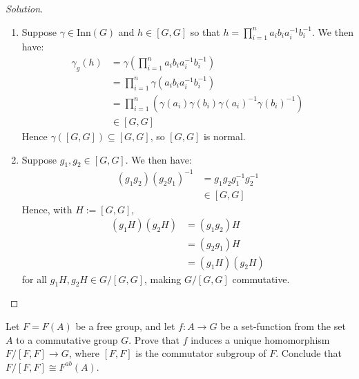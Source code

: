 \documentclass[12pt]{article}
\newenvironment{problem}[2][Problem]{\begin{trivlist}
\item[\hskip \labelsep {\bfseries #1}\hskip \labelsep {\bfseries #2.}]}{\end{trivlist}}
\newenvironment{solution}
  {\renewcommand\qedsymbol{$\blacksquare$}\begin{proof}[Solution]}
{\end{proof}}
\theoremstyle{remark}
\begin{document}
\begin{solution}~
  \begin{enumerate}
    \item Suppose $\gamma\in \text{Inn}(G)$ and $h\in [G,G]$ so that 
      $h = \prod_{i=1}^{n} a_ib_ia_i^{-1}b_i^{-1}$.
      We then have:
      \begin{align*}
        \gamma_g(h) &= \gamma\left( \prod_{i=1}^{n}a_ib_ia_i^{-1}b_i^{-1} \right) \\
        &= \prod_{i=1}^{n}\gamma(a_ib_ia_i^{-1}b_i^{-1}) \\
        &= \prod_{i=1}^{n}\left( \gamma(a_i)\gamma(b_i)\gamma(a_i)^{-1}\gamma(b_i)^{-1} \right) \\
        &\in [G,G]
      \end{align*}
      Hence $\gamma([G,G])\subseteq [G,G]$, so $[G,G]$ is normal.
    \item Suppose $g_1, g_2 \in [G,G]$. We then have:
      \begin{align*}
        (g_1g_2)(g_2g_1)^{-1} &= g_1g_2g_1^{-1}g_2^{-1} \\
        &\in [G,G] 
      \end{align*}
      Hence, with $H:=[G,G]$, 
      \begin{align*}
        (g_1H)(g_2H) &= (g_1g_2)H \\
        &= (g_2g_1)H \\
        &= (g_1H)(g_2H)
      \end{align*}
      for all $g_1H,g_2H\in G/[G,G]$, making $G/[G,G]$ commutative.
  \end{enumerate}
\end{solution}
\begin{problem}{7.12}
  Let $F=F(A)$ be a free group, and let $f:A\to G$ be a set-function from the set $A$
  to a commutative group $G$.
  Prove that $f$ induces a unique homomorphism $F/[F,F]\to G$, where $[F,F]$ is the commutator subgroup
  of $F$.
  Conclude that $F/[F,F]\cong F^{ab}(A)$.
\end{problem}
\end{document}
